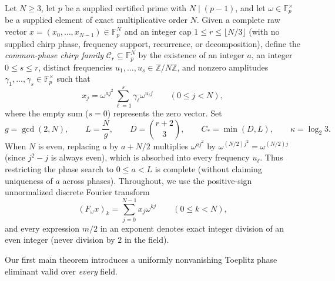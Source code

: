 \documentclass[11pt,reqno]{amsart}
\numberwithin{equation}{section}
\theoremstyle{definition}
\theoremstyle{remark}
\newcommand{\F}{\mathbb{F}}
\newcommand{\Z}{\mathbb{Z}}
\begin{document}
Let $N\ge 3$, let $p$ be a supplied certified prime with $N\mid (p-1)$, and let $\omega\in\F_p^\times$ be a supplied element of exact multiplicative order $N$. Given a complete raw vector $x = (x_0,\ldots,x_{N-1})\in\F_p^N$ and an integer cap $1\le r\le \lfloor N/3\rfloor$ (with no supplied chirp phase, frequency support, recurrence, or decomposition), define the \emph{common-phase chirp family} $\mathcal{C}_r\subseteq\F_p^N$ by the existence of an integer $a$, an integer $0\le s\le r$, distinct frequencies $u_1,\ldots,u_s\in\Z/N\Z$, and nonzero amplitudes $\gamma_1,\ldots,\gamma_s\in\F_p^\times$ such that
\begin{equation}
\label{eq:Cr-def}
x_j = \omega^{aj^2}\sum_{\ell=1}^s \gamma_\ell \omega^{u_\ell j}\qquad (0\le j<N),
\end{equation}
where the empty sum ($s=0$) represents the zero vector. Set
\begin{equation}
\label{eq:params}
g = \gcd(2,N),\qquad L = \frac{N}{g},\qquad
D = \binom{r+2}{3},\qquad C_* = \min(D,L),\qquad \kappa = \log_2 3.
\end{equation}
When $N$ is even, replacing $a$ by $a + N/2$ multiplies $\omega^{aj^2}$ by $\omega^{(N/2)j^2} = \omega^{(N/2)j}$ (since $j^2 - j$ is always even), which is absorbed into every frequency $u_\ell$. Thus restricting the phase search to $0\le a < L$ is complete (without claiming uniqueness of $a$ across phases). Throughout, we use the positive-sign unnormalized discrete Fourier transform
\begin{equation}
\label{eq:dft-def}
(F_\omega x)_k = \sum_{j=0}^{N-1} x_j \omega^{kj}\qquad (0\le k<N),
\end{equation}
and every expression $m/2$ in an exponent denotes exact integer division of an even integer (never division by $2$ in the field).

Our first main theorem introduces a uniformly nonvanishing Toeplitz phase eliminant valid over \emph{every} field.
\end{document}
